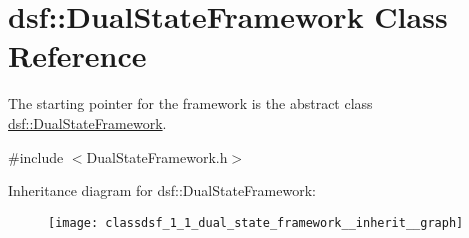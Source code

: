 \hypertarget{classdsf_1_1_dual_state_framework}{}\section{dsf\+:\+:Dual\+State\+Framework Class Reference}
\label{classdsf_1_1_dual_state_framework}


The starting pointer for the framework is the abstract class \hyperlink{classdsf_1_1_dual_state_framework}{dsf\+::\+Dual\+State\+Framework}.  




{\ttfamily \#include $<$Dual\+State\+Framework.\+h$>$}



Inheritance diagram for dsf\+:\+:Dual\+State\+Framework\+:\nopagebreak
\begin{figure}[H]
\begin{center}
\leavevmode
\texttt{[image: classdsf\_1\_1\_dual\_state\_framework\_\_inherit\_\_graph]}
\end{center}
\end{figure}
